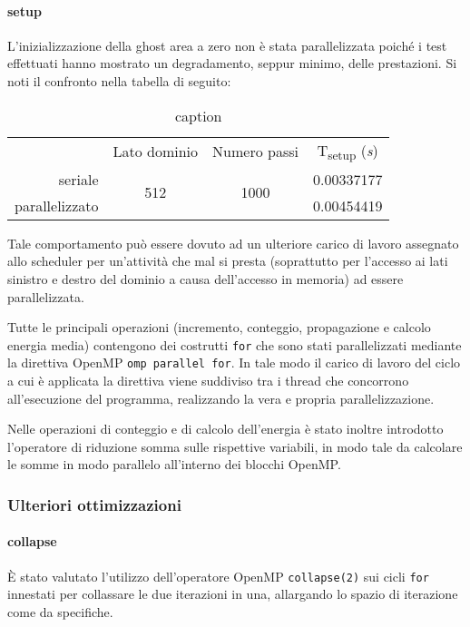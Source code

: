 \paragraph{setup}L'inizializzazione della ghost area a zero non è stata
parallelizzata poiché i test effettuati hanno mostrato un degradamento, seppur
minimo, delle prestazioni. Si noti il confronto nella tabella di seguito:

\begin{table}[ht]
\begin{tabular}{rccc}
\cmidrule[\heavyrulewidth]{2-4}
 & Lato dominio & Numero passi & T\textsubscript{setup} (\textit{s})\\
 \cmidrule[\lightrulewidth]{2-4}
 seriale & \multirow{2}{*}{512} & \multirow{2}{*}{1000} & 0.00337177\\
 parallelizzato &&& 0.00454419\\
\cmidrule[\heavyrulewidth]{2-4}
\end{tabular}
\caption{caption}
\end{table}

Tale comportamento può essere dovuto ad un ulteriore carico di lavoro assegnato
allo scheduler per un'attività che mal si presta (soprattutto per l'accesso ai
lati sinistro e destro del dominio a causa dell'accesso in memoria) ad essere
parallelizzata.

Tutte le principali operazioni (incremento, conteggio, propagazione e calcolo
energia media) contengono dei costrutti \texttt{for} che sono stati
parallelizzati mediante la direttiva OpenMP \texttt{omp parallel for}.
In tale modo il carico di lavoro del ciclo a cui è applicata la direttiva viene
suddiviso tra i thread che concorrono all'esecuzione del programma, realizzando
la vera e propria parallelizzazione.

Nelle operazioni di conteggio e di calcolo dell'energia è stato inoltre
introdotto l'operatore di riduzione somma sulle rispettive variabili, in modo
tale da calcolare le somme in modo parallelo all'interno dei blocchi OpenMP\@.

\subsubsection{Ulteriori ottimizzazioni}

\paragraph{collapse}

È stato valutato l'utilizzo dell'operatore OpenMP \texttt{collapse(2)} sui cicli
\texttt{for} innestati per collassare le due iterazioni in una, allargando lo
spazio di iterazione come da specifiche\cite{openmp2018reference}.

